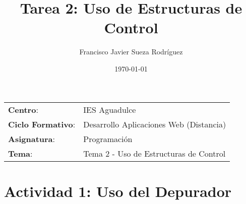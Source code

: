 


\title{
\vspace{10ex}
\normalfont \normalsize
\huge \textbf{Tarea 2: Uso de Estructuras de Control}
}
\author{Francisco Javier Sueza Rodríguez}
\date{\normalsize\today}



\maketitle

\thispagestyle{empty}

\vspace{75ex}

\begin{center}
    \begin{tabular}{l l}
        \textbf{Centro}: & IES Aguadulce \\
        \textbf{Ciclo Formativo}: & Desarrollo Aplicaciones Web (Distancia)\\
        \textbf{Asignatura}: & Programación\\
        \textbf{Tema}: & Tema 2 -  Uso de Estructuras de Control\\
    \end{tabular}
\end{center}

\newpage

\section{Actividad 1: Uso del Depurador}


%
%

